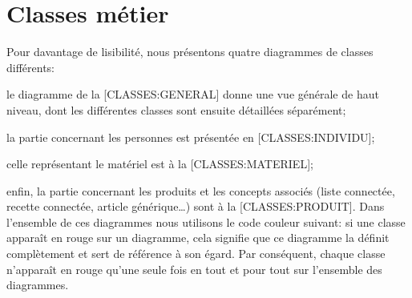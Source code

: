 \chapter{Classes métier}

Pour davantage de lisibilité, nous présentons quatre diagrammes de classes différents:
\startitemize
\item le diagramme de la [CLASSES:GENERAL] donne une vue générale de haut niveau, dont les différentes classes sont ensuite détaillées séparément;
\item la partie concernant les personnes est présentée en [CLASSES:INDIVIDU];
\item celle représentant le matériel est à la [CLASSES:MATERIEL];
\item enfin, la partie concernant les produits et les concepts associés (liste connectée, recette connectée, article générique\dots) sont à la [CLASSES:PRODUIT].
\stopitemize
Dans l'ensemble de ces diagrammes nous utilisons le code couleur suivant: si une classe apparaît en rouge sur un diagramme, cela signifie que ce diagramme la définit complètement et sert de référence à son égard.
Par conséquent, chaque classe n'apparaît en rouge qu'une seule fois en tout et pour tout sur l'ensemble des diagrammes.

{}

{}

{}

{}

